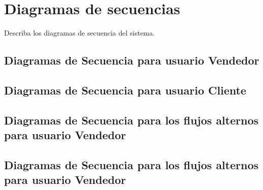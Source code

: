 \section{Diagramas de secuencias}

Describa los diagramas de secuencia del sistema.

\subsection{Diagramas de Secuencia para usuario Vendedor}

\subsection{Diagramas de Secuencia para usuario Cliente}

\subsection{Diagramas de Secuencia para los flujos alternos para usuario Vendedor}

\subsection{Diagramas de Secuencia para los flujos alternos para usuario Vendedor}